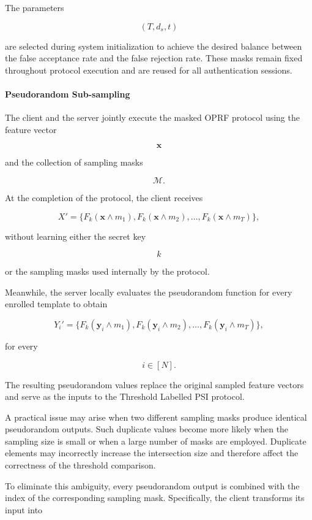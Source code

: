 \documentclass[11pt,a4paper]{article}
\begin{document}
The parameters

\[
(T,d_s,t)
\]

are selected during system initialization to achieve the desired balance between the false acceptance rate and the false rejection rate. These masks remain fixed throughout protocol execution and are reused for all authentication sessions.

\paragraph{Pseudorandom Sub-sampling}

The client and the server jointly execute the masked OPRF protocol using the feature vector

\[
\mathbf{x}
\]

and the collection of sampling masks

\[
\mathcal{M}.
\]

At the completion of the protocol, the client receives

\[
X'
=
\{
F_k(\mathbf{x}\wedge m_1),
F_k(\mathbf{x}\wedge m_2),
\ldots,
F_k(\mathbf{x}\wedge m_T)
\},
\]

without learning either the secret key

\[
k
\]

or the sampling masks used internally by the protocol.

Meanwhile, the server locally evaluates the pseudorandom function for every enrolled template to obtain

\[
Y_i'
=
\{
F_k(\mathbf{y}_i\wedge m_1),
F_k(\mathbf{y}_i\wedge m_2),
\ldots,
F_k(\mathbf{y}_i\wedge m_T)
\},
\]

for every

\[
i\in[N].
\]

The resulting pseudorandom values replace the original sampled feature vectors and serve as the inputs to the Threshold Labelled PSI protocol.

A practical issue may arise when two different sampling masks produce identical pseudorandom outputs. Such duplicate values become more likely when the sampling size is small or when a large number of masks are employed. Duplicate elements may incorrectly increase the intersection size and therefore affect the correctness of the threshold comparison.

To eliminate this ambiguity, every pseudorandom output is combined with the index of the corresponding sampling mask. Specifically, the client transforms its input into
\end{document}

